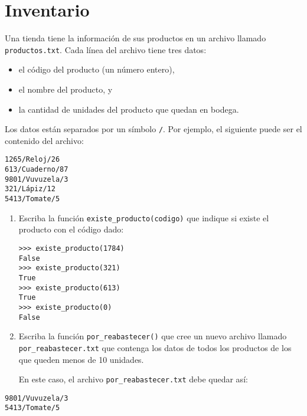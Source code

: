\section{Inventario}

Una tienda tiene la información de sus productos en un archivo llamado
\lstinline!productos.txt!. Cada línea del archivo tiene tres datos:

\begin{itemize}
\item
  el código del producto (un número entero),
\item
  el nombre del producto, y
\item
  la cantidad de unidades del producto que quedan en bodega.
\end{itemize}

Los datos están separados por un símbolo \lstinline!/!. Por ejemplo, el
siguiente puede ser el contenido del archivo:

\begin{lstlisting}
1265/Reloj/26
613/Cuaderno/87
9801/Vuvuzela/3
321/Lápiz/12
5413/Tomate/5
\end{lstlisting}

\begin{enumerate}[1.]
\item
  Escriba la función \lstinline!existe_producto(codigo)! que indique si
  existe el producto con el código dado:

\begin{lstlisting}
>>> existe_producto(1784)
False
>>> existe_producto(321)
True
>>> existe_producto(613)
True
>>> existe_producto(0)
False
\end{lstlisting}
\item
  Escriba la función \lstinline!por_reabastecer()! que cree un nuevo
  archivo llamado \lstinline!por_reabastecer.txt! que contenga los datos
  de todos los productos de los que queden menos de 10 unidades.

  En este caso, el archivo \lstinline!por_reabastecer.txt! debe quedar
  así:
\end{enumerate}

\begin{lstlisting}
9801/Vuvuzela/3
5413/Tomate/5
\end{lstlisting}

